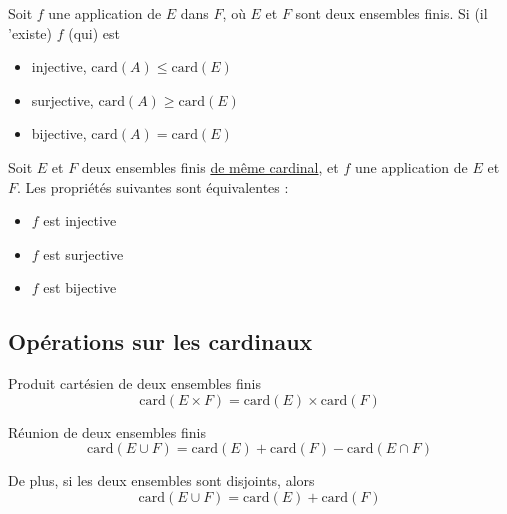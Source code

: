 \begin{Prop}{}{}
Soit $f$ une application de $E$ dans $F$, où $E$ et $F$ sont deux ensembles finis. 
Si (il 'existe) $f$ (qui) est 
\begin{itemize}

    \item injective, $\mathrm{card}(A) \le \mathrm{card}(E)$ 
    \item surjective, $\mathrm{card}(A) \ge \mathrm{card}(E)$
    \item bijective, $\mathrm{card}(A) = \mathrm{card}(E)$

\end{itemize}
\end{Prop}

\begin{Theorem}{}{}
Soit $E$ et $F$ deux ensembles finis \underline{de même cardinal}, et $f$ une application de $E$ et $F$. Les propriétés suivantes sont équivalentes : 
\begin{itemize}

    \item $f$ est injective
    \item $f$ est surjective 
    \item $f$ est bijective

\end{itemize}
\end{Theorem}



\subsection{Opérations sur les cardinaux} %
\label{sub:Opérations sur les cardinaux}

\begin{Theorem}{Produit cartésien de deux ensembles finis}{}
\begin{equation}
  \mathrm{card}(E \times F ) = \mathrm{card}(E) \times \mathrm{card}(F)
\end{equation}
\end{Theorem}

\begin{Theorem}{Réunion de deux ensembles finis}{}
\begin{equation}
  \mathrm{card}(E \cup F) = \mathrm{card}(E) + \mathrm{card}(F) - \mathrm{card}(E \cap F)
\end{equation}

De plus, si les deux ensembles sont disjoints, alors 
\begin{equation}
  \mathrm{card}(E \cup F ) = \mathrm{card}(E) + \mathrm{card}(F)
\end{equation}
\end{Theorem}

